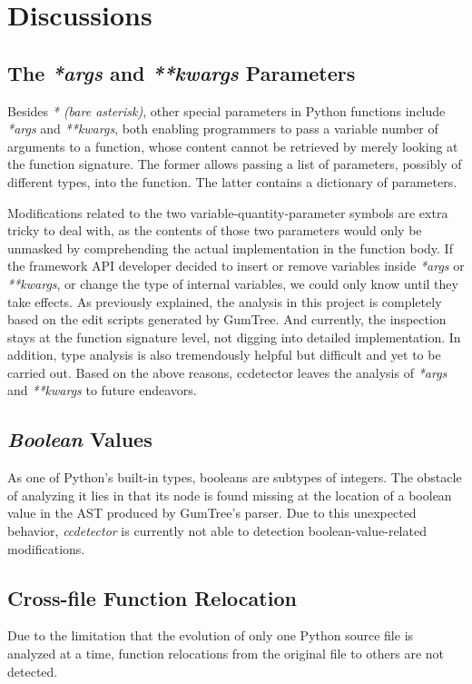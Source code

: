 \chapter{Discussions}
\label{chap:discussions}

\section{The \textit{*args} and \textit{**kwargs} Parameters}

Besides \textit{* (bare asterisk)}, other special parameters in Python functions include \textit{*args} and \textit{**kwargs}, both enabling programmers to pass a variable number of arguments to a function, whose content cannot be retrieved by merely looking at the function signature. The former allows passing a list of parameters, possibly of different types, into the function. The latter contains a dictionary of parameters.

Modifications related to the two variable-quantity-parameter symbols are extra tricky to deal with, as the contents of those two parameters would only be unmasked by comprehending the actual implementation in the function body. If the framework API developer decided to insert or remove variables inside \textit{*args} or \textit{**kwargs}, or change the type of internal variables, we could only know until they take effects.  As previously explained, the analysis in this project is completely based on the edit scripts generated by GumTree. And currently, the inspection stays at the function signature level, not digging into detailed implementation. In addition, type analysis is also tremendously helpful but difficult and yet to be carried out. Based on the above reasons, ccdetector leaves the analysis of \textit{*args} and \textit{**kwargs} to future endeavors.

\section{\textit{Boolean} Values}

As one of Python's built-in types, booleans are subtypes of integers. The obstacle of analyzing it lies in that its node is found missing at the location of a boolean value in the AST produced by GumTree's parser. Due to this unexpected behavior, \textit{ccdetector} is currently not able to detection boolean-value-related modifications.

\section{Cross-file Function Relocation}

Due to the limitation that the evolution of only one Python source file is analyzed at a time, function relocations from the original file to others are not detected.
